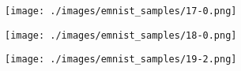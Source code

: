 \begin{figure}[H]
\begin{subfigure}{.10\textwidth}
    \end{subfigure}%
    \begin{subfigure}{.10\textwidth}
        \centering
        \texttt{[image: ./images/emnist\_samples/17-0.png]}
    \end{subfigure}%
    \begin{subfigure}{.10\textwidth}
        \centering
        \texttt{[image: ./images/emnist\_samples/18-0.png]}
    \end{subfigure}%
    \begin{subfigure}{.10\textwidth}
        \centering
        \texttt{[image: ./images/emnist\_samples/19-2.png]}
    \end{subfigure}%

    \par\medskip


\end{figure}
